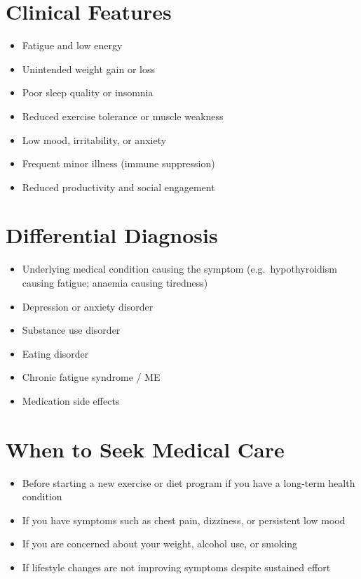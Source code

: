 \section*{Clinical Features}
\begin{itemize}
    \item Fatigue and low energy
    \item Unintended weight gain or loss
    \item Poor sleep quality or insomnia
    \item Reduced exercise tolerance or muscle weakness
    \item Low mood, irritability, or anxiety
    \item Frequent minor illness (immune suppression)
    \item Reduced productivity and social engagement
\end{itemize}

\section*{Differential Diagnosis}
\begin{itemize}
    \item Underlying medical condition causing the symptom (e.g.\ hypothyroidism causing fatigue; anaemia causing tiredness)
    \item Depression or anxiety disorder
    \item Substance use disorder
    \item Eating disorder
    \item Chronic fatigue syndrome / ME
    \item Medication side effects
\end{itemize}

\section*{When to Seek Medical Care}
\begin{itemize}
    \item Before starting a new exercise or diet program if you have a long-term health condition
    \item If you have symptoms such as chest pain, dizziness, or persistent low mood
    \item If you are concerned about your weight, alcohol use, or smoking
    \item If lifestyle changes are not improving symptoms despite sustained effort
\end{itemize}

